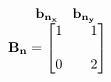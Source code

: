 \documentclass[preview]{standalone}
\begin{document}
\begin{align*}
\begin{array}{cc}\begin{matrix}\hspace{1cm} \mathbf{b_{n_x}}  & \mathbf{b_{n_y}} \hspace{0.6cm} \end{matrix} \\ \mathbf{B_n} = \begin{bmatrix} 1 & \quad 1 \\ \\0 &  \quad 2 \end{bmatrix} \end{array}
\end{align*}
\end{document}
